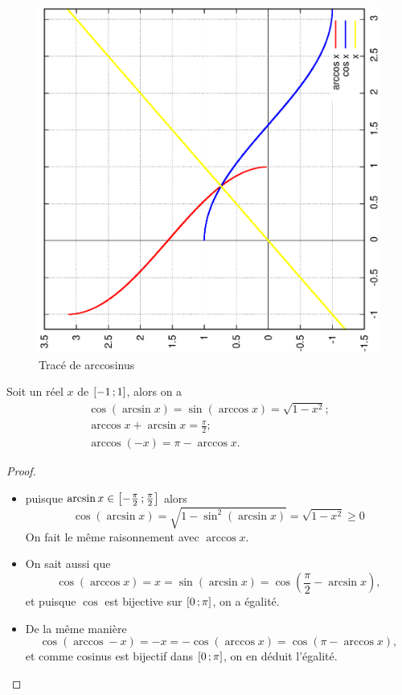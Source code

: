 %
\begin{figure}
  \centering
  \includegraphics[scale=0.4,angle=-90]{arccos.ps}
  \caption{Tracé de arccosinus}
  \label{fig:tracearccosinus}
\end{figure}
%
\begin{prop}
  Soit un réel $x$ de $\left[ -1 \, ;  1 \right]$, alors on a
  \begin{gather}
    \cos( \arcsin x)=\sin( \arccos x)=\sqrt{1-x^2}; \\
    \arccos x + \arcsin x = \frac{\pi}{2};\\
    \arccos(-x) = \pi - \arccos x.
  \end{gather}
\end{prop}
\begin{proof}
  \begin{itemize}
  \item puisque $\arcsin x \in \left[ -\frac{\pi}{2} \, ;  \frac{\pi}{2} \right]$ alors
    \begin{equation}
      \cos( \arcsin x)=\sqrt{1- \sin^2(\arcsin x)}=\sqrt{1-x^2} \geq 0
    \end{equation}
    On fait le même raisonnement avec $\arccos x$.
  \item On sait aussi que
    \begin{equation}
      \cos( \arccos x) = x = \sin( \arcsin x)=\cos \left( \frac{\pi}{2} - \arcsin x \right),
    \end{equation}
    et puisque $\cos$ est bijective sur $\left[ 0 \, ;  \pi \right]$, on a égalité.
  \item De la même manière
    \begin{equation}
      \cos( \arccos -x)=-x=-\cos( \arccos x)=\cos(\pi - \arccos x),
    \end{equation}
    et comme cosinus est bijectif dans $\left[ 0 \, ;  \pi \right]$, on en déduit l'égalité.
  \end{itemize}
\end{proof}
%
